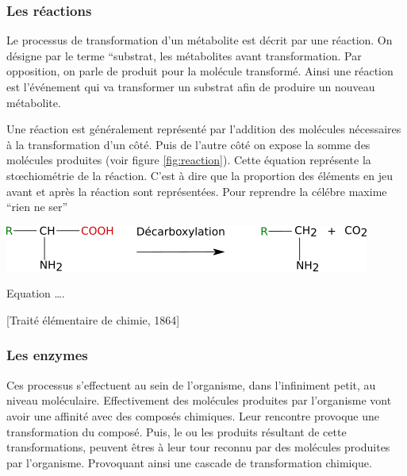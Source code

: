 \begin{refsection}
	\subsubsection{Les réactions}
	Le processus de transformation d’un métabolite est décrit par une réaction. On désigne par le terme “substrat, les métabolites avant transformation. Par opposition, on parle de produit pour la molécule transformé. Ainsi une réaction est l'événement qui va transformer un substrat afin de produire un nouveau métabolite.
    
    Une réaction est généralement représenté par l’addition des molécules nécessaires à la transformation d’un côté. Puis de l’autre côté on expose la somme des molécules produites (voir figure \ref{fig:reaction}). Cette équation  représente la stœchiométrie de la réaction. C’est à dire que la proportion des éléments en jeu avant et après la réaction sont représentées. Pour reprendre la célébre maxime “rien ne ser”
    
    \begin{shadedfigure}
        \centering
        \includegraphics[width=\textwidth]{img/decarboxylation.png}
        \caption{Equation ….}
        \label{fig:reaction}
    \end{shadedfigure}
    
    [Traité élémentaire de chimie, 1864]
    
    
    \subsubsection{Les enzymes}
    Ces processus s'effectuent au sein de l'organisme, dans l'infiniment petit, au niveau moléculaire. Effectivement des molécules produites par l'organisme vont avoir une affinité avec des composés chimiques. Leur rencontre provoque une transformation du composé. Puis, le ou les produits résultant de cette transformations, peuvent êtres à leur tour reconnu par des molécules produites par l'organisme. Provoquant ainsi une cascade de transformation chimique.
    

\end{refsection}
